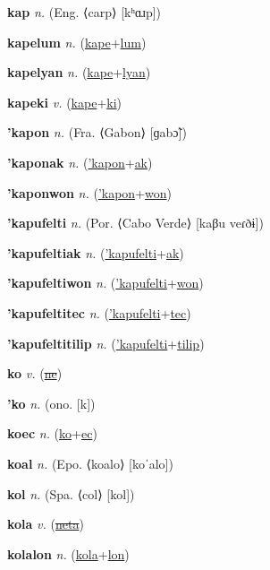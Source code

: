 \textbf{\hypertarget{kap}{kap}} \textit{n.} (Eng. ⟨carp⟩ [kʰɑɹp])


\textbf{\hypertarget{kapelum}{kapelum}} \textit{n.} (\hyperlink{kape}{kape}+\allowbreak \hyperlink{lum}{lum})


\textbf{\hypertarget{kapelyan}{kapelyan}} \textit{n.} (\hyperlink{kape}{kape}+\allowbreak \hyperlink{lyan}{lyan})


\textbf{\hypertarget{kapeki}{kapeki}} \textit{v.} (\hyperlink{kape}{kape}+\allowbreak \hyperlink{ki}{ki})


\textbf{\hypertarget{'kapon}{'kapon}} \textit{n.} (Fra. ⟨Gabon⟩ [ɡabɔ̃])


\textbf{\hypertarget{'kaponak}{'kaponak}} \textit{n.} (\hyperlink{'kapon}{'kapon}+\allowbreak \hyperlink{ak}{ak})


\textbf{\hypertarget{'kaponwon}{'kaponwon}} \textit{n.} (\hyperlink{'kapon}{'kapon}+\allowbreak \hyperlink{won}{won})


\textbf{\hypertarget{'kapufelti}{'kapufelti}} \textit{n.} (Por. ⟨Cabo Verde⟩ [kaβu veɾðɨ])


\textbf{\hypertarget{'kapufeltiak}{'kapufeltiak}} \textit{n.} (\hyperlink{'kapufelti}{'kapufelti}+\allowbreak \hyperlink{ak}{ak})


\textbf{\hypertarget{'kapufeltiwon}{'kapufeltiwon}} \textit{n.} (\hyperlink{'kapufelti}{'kapufelti}+\allowbreak \hyperlink{won}{won})


\textbf{\hypertarget{'kapufeltitec}{'kapufeltitec}} \textit{n.} (\hyperlink{'kapufelti}{'kapufelti}+\allowbreak \hyperlink{tec}{tec})


\textbf{\hypertarget{'kapufeltitilip}{'kapufeltitilip}} \textit{n.} (\hyperlink{'kapufelti}{'kapufelti}+\allowbreak \hyperlink{tilip}{tilip})


\textbf{\hypertarget{ko}{ko}} \textit{v.} (\hyperlink{ne}{\sout{ne}})


\textbf{\hypertarget{'ko}{'ko}} \textit{n.} (ono. [k])


\textbf{\hypertarget{koec}{koec}} \textit{n.} (\hyperlink{ko}{ko}+\allowbreak \hyperlink{ec}{ec})


\textbf{\hypertarget{koal}{koal}} \textit{n.} (Epo. ⟨koalo⟩ [koˈalo])


\textbf{\hypertarget{kol}{kol}} \textit{n.} (Spa. ⟨col⟩ [kol])


\textbf{\hypertarget{kola}{kola}} \textit{v.} (\hyperlink{neta}{\sout{neta}})


\textbf{\hypertarget{kolalon}{kolalon}} \textit{n.} (\hyperlink{kola}{kola}+\allowbreak \hyperlink{lon}{lon})


